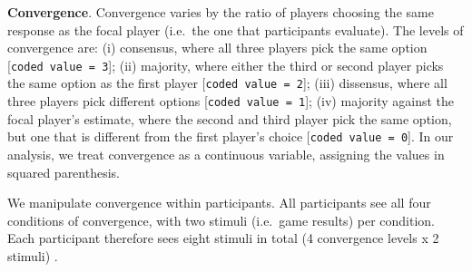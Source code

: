 \documentclass[
]{article}
\begin{document}
\textbf{Convergence}. Convergence varies by the ratio of players
choosing the same response as the focal player (i.e.~the one that
participants evaluate). The levels of convergence are: (i) consensus,
where all three players pick the same option
{[}\texttt{coded\ value\ =\ 3}{]}; (ii) majority, where either the third
or second player picks the same option as the first player
{[}\texttt{coded\ value\ =\ 2}{]}; (iii) dissensus, where all three
players pick different options {[}\texttt{coded\ value\ =\ 1}{]}; (iv)
majority against the focal player's estimate, where the second and third
player pick the same option, but one that is different from the first
player's choice {[}\texttt{coded\ value\ =\ 0}{]}. In our analysis, we
treat convergence as a continuous variable, assigning the values in
squared parenthesis.

We manipulate convergence within participants. All participants see all
four conditions of convergence, with two stimuli (i.e.~game results) per
condition. Each participant therefore sees eight stimuli in total (4
convergence levels x 2 stimuli) .
\end{document}
